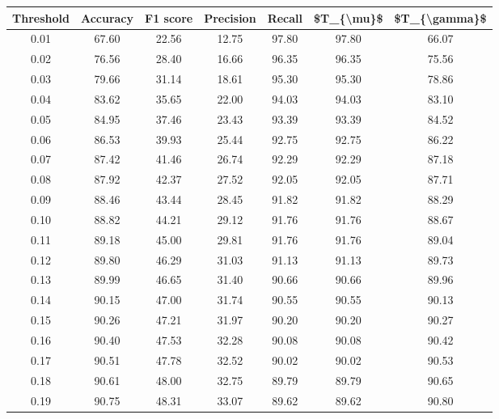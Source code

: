 \begin{tabular}{|c|c|c|c|c|c|c|}
\toprule
 Threshold &  Accuracy &  F1 score &  Precision &  Recall &  \$T\_\{\textbackslash mu\}\$ &  \$T\_\{\textbackslash gamma\}\$ \\
\hline
      0.01 &     67.60 &     22.56 &      12.75 &   97.80 &      97.80 &         66.07 \\
      0.02 &     76.56 &     28.40 &      16.66 &   96.35 &      96.35 &         75.56 \\
      0.03 &     79.66 &     31.14 &      18.61 &   95.30 &      95.30 &         78.86 \\
      0.04 &     83.62 &     35.65 &      22.00 &   94.03 &      94.03 &         83.10 \\
      0.05 &     84.95 &     37.46 &      23.43 &   93.39 &      93.39 &         84.52 \\
      0.06 &     86.53 &     39.93 &      25.44 &   92.75 &      92.75 &         86.22 \\
      0.07 &     87.42 &     41.46 &      26.74 &   92.29 &      92.29 &         87.18 \\
      0.08 &     87.92 &     42.37 &      27.52 &   92.05 &      92.05 &         87.71 \\
      0.09 &     88.46 &     43.44 &      28.45 &   91.82 &      91.82 &         88.29 \\
      0.10 &     88.82 &     44.21 &      29.12 &   91.76 &      91.76 &         88.67 \\
      0.11 &     89.18 &     45.00 &      29.81 &   91.76 &      91.76 &         89.04 \\
      0.12 &     89.80 &     46.29 &      31.03 &   91.13 &      91.13 &         89.73 \\
      0.13 &     89.99 &     46.65 &      31.40 &   90.66 &      90.66 &         89.96 \\
      0.14 &     90.15 &     47.00 &      31.74 &   90.55 &      90.55 &         90.13 \\
      0.15 &     90.26 &     47.21 &      31.97 &   90.20 &      90.20 &         90.27 \\
      0.16 &     90.40 &     47.53 &      32.28 &   90.08 &      90.08 &         90.42 \\
      0.17 &     90.51 &     47.78 &      32.52 &   90.02 &      90.02 &         90.53 \\
      0.18 &     90.61 &     48.00 &      32.75 &   89.79 &      89.79 &         90.65 \\
      0.19 &     90.75 &     48.31 &      33.07 &   89.62 &      89.62 &         90.80 \\

\end{tabular}
